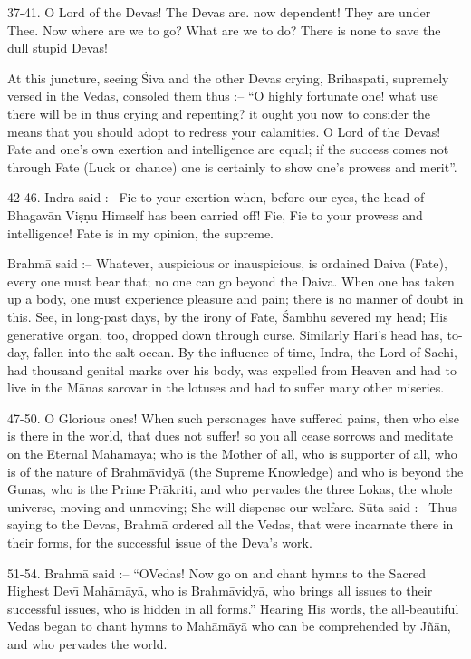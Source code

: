 37-41. O Lord of the Devas! The Devas are. now dependent! They are under Thee. Now where are we to go? What are we to do? There is none to save the dull stupid Devas!

At this juncture, seeing \'Siva and the other Devas crying, Brihaspati, supremely versed in the Vedas, consoled them thus :-- ``O highly fortunate one! what use there will be in thus crying and repenting? it ought you now to consider the means that you should adopt to redress your calamities. O Lord of the Devas! Fate and one's own exertion and intelligence are equal; if the success comes not through Fate (Luck or chance) one is certainly to show one's prowess and merit''.

42-46. Indra said :-- Fie to your exertion when, before our eyes, the head of Bhagav\=an Vi\d{s}\d{n}u Himself has been carried off! Fie, Fie to your prowess and intelligence! Fate is in my opinion, the supreme.

Brahm\=a said :-- Whatever, auspicious or inauspicious, is ordained Daiva (Fate), every one must bear that; no one can go beyond the Daiva. When one has taken up a body, one must experience pleasure and pain; there is no manner of doubt in this. See, in long-past days, by the irony of Fate, \'Sambhu severed my head; His generative organ, too, dropped down through curse. Similarly Hari's head has, to-day, fallen into the salt ocean. By the influence of time, Indra, the Lord of Sachi, had thousand genital marks over his body, was expelled from Heaven and had to live in the M\=anas sarovar in the lotuses and had to suffer many other miseries.

47-50. O Glorious ones! When such personages have suffered pains, then who else is there in the world, that dues not suffer! so you all cease sorrows and meditate on the Eternal Mah\=am\=ay\=a; who is the Mother of all, who is supporter of all, who is of the nature of Brahm\=avidy\=a (the Supreme Knowledge) and who is beyond the Gunas, who is the Prime Pr\=akriti, and who pervades the three Lokas, the whole universe, moving and unmoving; She will dispense our welfare. S\=uta said :-- Thus saying to the Devas, Brahm\=a ordered all the Vedas, that were incarnate there in their forms, for the successful issue of the Deva's work.

51-54. Brahm\=a said :-- ``OVedas! Now go on and chant hymns to the Sacred Highest Dev\={\i} Mah\=am\=ay\=a, who is Brahm\=avidy\=a, who brings all issues to their successful issues, who is hidden in all forms.'' Hearing His words, the all-beautiful Vedas began to chant hymns to Mah\=am\=ay\=a who can be comprehended by J\~n\=an, and who pervades the world.

